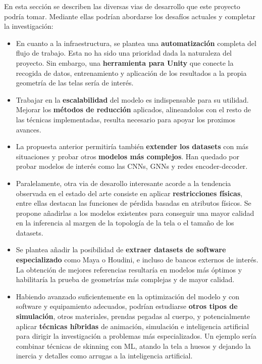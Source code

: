 En esta sección se describen las diversas vias de desarrollo que este proyecto podría tomar. Mediante ellas podrían abordarse los desafíos actuales y completar la investigación:
\begin{itemize}
    \item En cuanto a la infraestructura, se plantea una \textbf{automatización} completa del flujo de trabajo. Esta no ha sido una prioridad dada la naturaleza del proyecto. Sin embargo, una \textbf{herramienta para Unity} que conecte la recogida de datos, entrenamiento y aplicación de los resultados a la propia geometría de las telas sería de interés.
    \item Trabajar en la \textbf{escalabilidad} del modelo es indispensable para su utilidad. Mejorar los \textbf{métodos de reducción} aplicados, alineandolos con el resto de las técnicas implementadas, resulta necesario para apoyar los proximos avances.
    \item La propuesta anterior permitiría también \textbf{extender los datasets} con más situaciones y probar otros \textbf{modelos más complejos}. Han quedado por probar modelos de interés como las CNNs, GNNs y redes encoder-decoder.
    \item Paralelamente, otra via de desarollo interesante acorde a la tendencia observada en el estado del arte consiste en aplicar \textbf{restricciones físicas}, entre ellas destacan las funciones de pérdida basadas en atributos físicos. Se propone añadirlas a los modelos existentes para conseguir una mayor calidad en la inferencia al margen de la topología de la tela o el tamaño de los datasets.
    \item Se plantea añadir la posibilidad de \textbf{extraer datasets de software especializado} como Maya o Houdini, e incluso de bancos externos de interés. La obtención de mejores referencias resultaría en modelos más óptimos y habilitaría la prueba de geometrías más complejas y de mayor calidad.
    \item Habiendo avanzado suficientemente en la optimización del modelo y con software y equipamiento adecuados, podrían estudiarse \textbf{otros tipos de simulación}, otros materiales, prendas pegadas al cuerpo, y potencialmente aplicar \textbf{técnicas híbridas} de animación, simulación e inteligencia artificial para dirigir la investigación a problemas más especializados. Un ejemplo sería combinar técnicas de skinning con ML, atando la tela a huesos y dejando la inercia y detalles como arrugas a la inteligencia artificial.
\end{itemize}